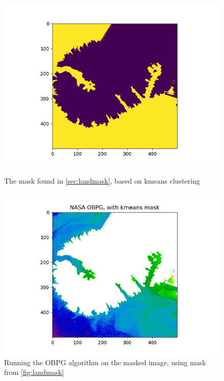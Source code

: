 \begin{figure}[h!]
    \begin{minipage}{.5\textwidth}
        \centering
        \includegraphics[width=\textwidth]{../fig/landmask.png}
        \caption{The mask found in \cref{sec:landmask}, based on kmeans clustering}
        \label{fig:landmask}
        \end{minipage}
    \begin{minipage}{.5\textwidth}
        \centering
        \includegraphics[width=1.5\textwidth]{../fig/NASA OBPG, with kmeans mask.png}
        \caption{Running the OBPG algorithm on the masked image, using mask from \cref{fig:landmask}}
        \label{fig:mask_obpg}
        \end{minipage}%
    \end{figure}


